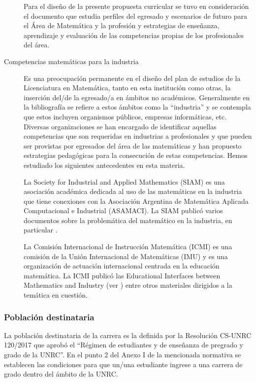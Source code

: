 \documentclass[a4paper, 12pt]{article}
\begin{document}
\begin{description}
Para el diseño de la presente propuesta curricular se tuvo en consideración el documento \cite{paniagua2013educacion} 
que estudia perfiles del egresado y escenarios de futuro para el Área de Matemática y la profesión y estrategias de enseñanza, aprendizaje y evaluación de las competencias propias de los profesionales del área. 
\item[Competencias matemáticas para la industria] 
Es una preocupación permanente en el diseño del plan de estudios de la Licenciatura en Matemática, tanto en esta institución como otras, la inserción del/de la egresado/a en ámbitos no académicos. Generalmente  en la bibliografía se refiere a estos ámbitos como la ``industria'' y  se contempla que estos incluyen organismos públicos, empresas informáticas, etc. Diversas organizaciones se han encargado de identificar aquellas competencias que son requeridas en industrias a profesionales y que pueden ser provistas por egresados del área de las matemáticas y han propuesto estrategias pedagógicas para la consecución de estas competencias. Hemos estudiado los siguientes antecedentes en esta materia.

La Society for Industrial and Applied Mathematics (SIAM)  es una asociación académica dedicada al uso de las matemáticas en la industria que tiene conexiones con la Asociación Argentina de Matemática Aplicada Computacional e Industrial (ASAMACI). La SIAM publicó varios documentos sobre la problemática del matemático en la industria, en particular \cite{society1996siam,society2012siam}.


 La Comisión Internacional de Instrucción Matemática (ICMI) es una comisión de la Unión Internacional de Matemáticas (IMU) y es una organización de actuación internacional centrada en la educación matemática. La ICMI publicó las Educational Interfaces between Mathematics and Industry (ver \cite{damlamian2013educational}) entre otros materiales dirigidos a la temática en cuestión.
\end{description}



\subsubsection{Población destinataria}

La población destinataria de la carrera es la definida por la Resolución CS-UNRC 120/2017 que aprobó el ``Régimen  de estudiantes y de enseñanza de pregrado y grado de la UNRC''. En el punto 2 del Anexo I de la mencionada normativa se establecen las condiciones para que un/una estudiante ingrese a una carrera de grado dentro del ámbito de la UNRC.
\end{document}
